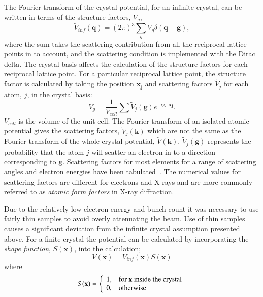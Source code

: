 The Fourier transform of the crystal potential, for an infinite crystal, can be written in terms of the structure factors, $V_g$,
\begin{equation}
\tilde{V}_{inf}(\mathbf{q}) = (2\pi)^3 \sum_g V_g \delta(\mathbf{q} - \mathbf{g}),
\end{equation}
where the sum takes the scattering contribution from all the reciprocal lattice points in to account, and the scattering condition is implemented with the Dirac delta.
The crystal basis affects the calculation of the structure factors for each reciprocal lattice point.
For a particular reciprocal lattice point, the structure factor is calculated by taking the position $\mathbf{x_j}$ and scattering factors $\tilde{V}_j$ for each atom, $j$, in the crystal basis:
\begin{equation}
V_g = \frac{1}{V_{cell}}\sum\tilde{V}_j(\mathbf{g})e^{-i\mathbf{g}\cdot\mathbf{x_j}}.
\end{equation}
$V_{cell}$ is the volume of the unit cell. The Fourier transform of an isolated atomic potential gives the scattering factors, $\tilde{V}_j(\mathbf{k})$ which are not the same as the Fourier transform of the whole crystal potential, $\tilde{V}(\mathbf{k})$.
$\tilde{V}_j(\mathbf{g})$ represents the probability that the atom $j$ will scatter an electron in to a direction corresponding to $\mathbf{g}$.
Scattering factors for most elements for a range of scattering angles and electron energies have been tabulated~\cite{peng_electron_1999}.
The numerical values for scattering factors are different for electrons and X-rays and are more commonly referred to as \emph{atomic form factors} in X-ray diffraction.

Due to the relatively low electron energy and bunch count it was necessary to use fairly thin samples to avoid overly attenuating the beam.
Use of thin samples causes a significant deviation from the infinite crystal assumption presented above.
For a finite crystal the potential can be calculated by incorporating the \emph{shape function}, $S(\mathbf{x})$, into the calculation;
\begin{equation}
V(\mathbf{x}) = V_{inf}(\mathbf{x})S(\mathbf{x})
\end{equation}
where
\begin{equation}
S(\mathbf{x}) = \left\{\begin{array}{l l}
1, & \text{for $\mathbf{x}$ inside the crystal} \\
0, & \text{otherwise}
\end{array}
\right.
\end{equation}

